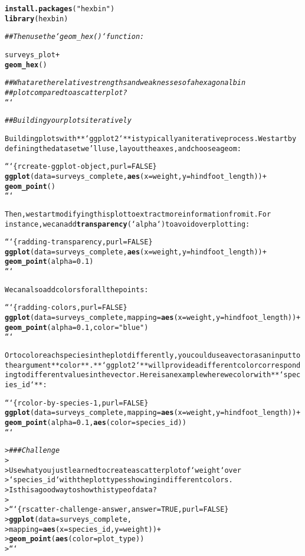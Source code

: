 \documentclass{article}\usepackage[]{graphicx}\usepackage[]{xcolor}
\makeatletter
\newcommand{\hlstr}[1]{\textcolor[rgb]{0.192,0.494,0.8}{#1}}%
\newcommand{\hlcom}[1]{\textcolor[rgb]{0.678,0.584,0.686}{\textit{#1}}}%
\newcommand{\hlkwd}[1]{\textcolor[rgb]{0.737,0.353,0.396}{\textbf{#1}}}%
\newenvironment{kframe}{%
 \def\at@end@of@kframe{}%
 \ifinner\ifhmode%
  \def\at@end@of@kframe{\end{minipage}}%
  \begin{minipage}{\columnwidth}%
 \fi\fi%
 \def\FrameCommand##1{\hskip\@totalleftmargin \hskip-\fboxsep
 \colorbox{shadecolor}{##1}\hskip-\fboxsep
     \hskip-\linewidth \hskip-\@totalleftmargin \hskip\columnwidth}%
 \MakeFramed {\advance\hsize-\width
   \@totalleftmargin\z@ \linewidth\hsize
   \@setminipage}}%
 {\par\unskip\endMakeFramed%
 \at@end@of@kframe}
\newenvironment{knitrout}{}{} %
\makeatother
\begin{document}
\begin{knitrout}
\begin{kframe}
\begin{alltt}
\hlkwd{install.packages}(\hlstr{"hexbin"})
\hlkwd{library}(hexbin)

\hlcom{## Then use the `geom_hex()` function:}

surveys_plot +
    \hlkwd{geom_hex}()

\hlcom{## What are the relative strengths and weaknesses of a hexagonal bin}
\hlcom{## plot compared to a scatter plot?}
```

\hlcom{## Building your plots iteratively}

Building plots with **`ggplot2`** is typically an iterative process. We start by
defining the dataset we'll use, lay out the axes, and choose a geom:

```\{r create-ggplot-object, purl = FALSE\}
\hlkwd{ggplot}(data = surveys_complete, \hlkwd{aes}(x = weight, y = hindfoot_length)) +
    \hlkwd{geom_point}()
```

Then, we start modifying this plot to extract more information from it. For
instance, we can add \hlkwd{transparency} (`alpha`) to avoid overplotting:

```\{r adding-transparency, purl = FALSE\}
\hlkwd{ggplot}(data = surveys_complete, \hlkwd{aes}(x = weight, y = hindfoot_length)) +
    \hlkwd{geom_point}(alpha = 0.1)
```

We can also add colors for all the points:

```\{r adding-colors, purl=FALSE\}
\hlkwd{ggplot}(data = surveys_complete, mapping = \hlkwd{aes}(x = weight, y = hindfoot_length)) +
    \hlkwd{geom_point}(alpha = 0.1, color = \hlstr{"blue"})
```

Or to color each species in the plot differently, you could use a vector as an input to the argument **color**. **`ggplot2`** will provide a different color corresponding to different values in the vector. Here is an example where we color with **`species_id`**:


```\{r color-by-species-1, purl=FALSE\}
\hlkwd{ggplot}(data = surveys_complete, mapping = \hlkwd{aes}(x = weight, y = hindfoot_length)) +
    \hlkwd{geom_point}(alpha = 0.1, \hlkwd{aes}(color = species_id))
```

> \hlcom{### Challenge}
>
> Use what you just learned to create a scatter plot of `weight` over
> `species_id` with the plot types showing in different colors.
> Is this a good way to show this type of data?
>
> ```\{r scatter-challenge-answer, answer=TRUE, purl=FALSE\}
> \hlkwd{ggplot}(data = surveys_complete,
>        mapping = \hlkwd{aes}(x = species_id, y = weight)) +
>    \hlkwd{geom_point}(\hlkwd{aes}(color = plot_type))
> ```



\end{alltt}
\end{kframe}
\end{knitrout}
\end{document}
